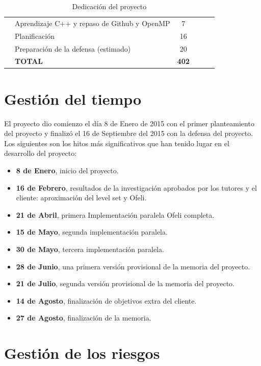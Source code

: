 \begin{table}[H]
\begin{tabular}{clcp{20mm}p{20mm}M{20mm}}
        & Aprendizaje C++ y repaso de Github y OpenMP  			& 7                    \\ \cmidrule(l){2-3}
        & Planificaci\'{o}n 								& 16 \\ \cmidrule(l){2-3}
        & Preparaci\'{o}n de la defensa (estimado)         		& 20                   \\ \midrule \midrule
        & \bf{TOTAL}            & \textbf{402} \\ \midrule                
	\end{tabular}
	\caption{Dedicaci\'{o}n del proyecto}	
	\label{dedicacionTemporal}	
\end{table}




\section{Gesti\'{o}n del tiempo}

El proyecto dio comienzo el d\'{i}a 8 de Enero de 2015 con el primer planteamiento del proyecto y finaliz\'{o} el 16 de Septiembre del 2015 con la defensa del proyecto. Los siguientes son los hitos m\'{a}s significativos que han tenido lugar en el desarrollo del proyecto:
 
\begin{itemize}
	\item \textbf{8 de Enero}, inicio del proyecto.
	\item \textbf{16 de Febrero},  resultados de la investigaci\'{o}n aprobados por los tutores y el cliente: aproximaci\'{o}n del level set y Ofeli.
	\item \textbf{21 de Abril}, primera Implementaci\'{o}n paralela Ofeli completa.
	\item \textbf{15 de Mayo}, segunda implementaci\'{o}n paralela.
	\item \textbf{30 de Mayo}, tercera implementaci\'{o}n paralela.
	\item \textbf{28 de Junio}, una primera versi\'{o}n provisional de la memoria del proyecto.
	\item \textbf{21 de Julio}, segunda versi\'{o}n provisional de la memoria del proyecto.
	\item \textbf{14 de Agosto}, finalizaci\'{o}n de objetivos extra del cliente.
	\item \textbf{27 de Agosto}, finalizaci\'{o}n de la memoria.
\end{itemize}




\section{Gesti\'{o}n de los riesgos}\label{riesgos}

